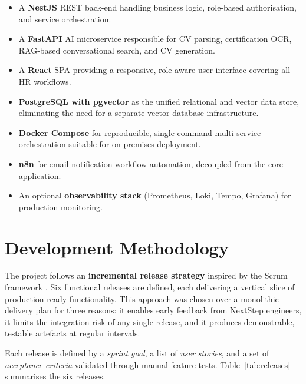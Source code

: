 \documentclass[12pt,a4paper,oneside,openany]{report}
\begin{document}
\begin{itemize}
  \item A \textbf{NestJS} \ac{REST} back-end handling business logic, role-based authorisation, and service orchestration.
  \item A \textbf{FastAPI} AI microservice responsible for \ac{CV} parsing, certification \ac{OCR}, \ac{RAG}-based conversational search, and \ac{CV} generation.
  \item A \textbf{React} \ac{SPA} providing a responsive, role-aware user interface covering all HR workflows.
  \item \textbf{PostgreSQL with pgvector} as the unified relational and vector data store, eliminating the need for a separate vector database infrastructure.
  \item \textbf{Docker Compose} for reproducible, single-command multi-service orchestration suitable for on-premises deployment.
  \item \textbf{n8n} for email notification workflow automation, decoupled from the core application.
  \item An optional \textbf{observability stack} (Prometheus, Loki, Tempo, Grafana) for production monitoring.
\end{itemize}

\section{Development Methodology}
\label{sec:methodology}

The project follows an \textbf{incremental release strategy} inspired by the Scrum framework \cite{schwaber2020scrum}. Six functional releases are defined, each delivering a vertical slice of production-ready functionality. This approach was chosen over a monolithic delivery plan for three reasons: it enables early feedback from NextStep engineers, it limits the integration risk of any single release, and it produces demonstrable, testable artefacts at regular intervals.

Each release is defined by a \textit{sprint goal}, a list of \textit{user stories}, and a set of \textit{acceptance criteria} validated through manual feature tests. Table~\ref{tab:releases} summarises the six releases.
\end{document}
